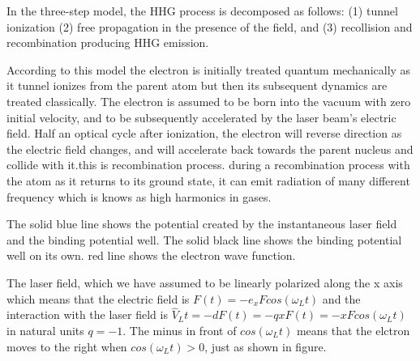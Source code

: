 In the three-step model, the HHG process is decomposed as follows: (1)
tunnel ionization (2) free propagation in the presence of the field, and
(3) recollision and recombination producing HHG emission.

According to this model the electron is initially treated quantum
mechanically as it tunnel ionizes from the parent atom but then its
subsequent dynamics are treated classically. The electron is assumed to
be born into the vacuum with zero initial velocity, and to be
subsequently accelerated by the laser beam's electric field. Half an
optical cycle after ionization, the electron will reverse direction as
the electric field changes, and will accelerate back towards the parent
nucleus and collide with it.this is recombination process. during a
recombination process with the atom as it returns to its ground state,
it can emit radiation of many different frequency which is knows as high
harmonics in gases.

The solid blue line shows the potential created by the instantaneous
laser field and the binding potential well. The solid black line shows
the binding potential well on its own. red line shows the electron wave
function.

The laser field, which we have assumed to be linearly polarized along
the x axis which means that the electric field is
\(F(t) = -e_xFcos(\omega_L t)\) and the interaction with the laser field
is \(\hat V_L t=-dF(t) = -qxF(t)=-xFcos(\omega_Lt)\) in natural units
\(q=-1\). The minus in front of \(cos(\omega_Lt)\) means that the
elctron moves to the right when \(cos(\omega_Lt)>0\), just as shown in
figure.
